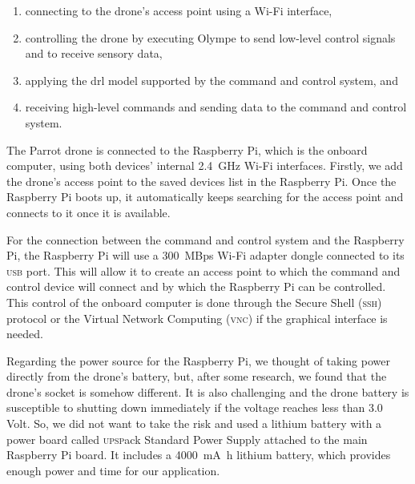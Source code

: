 \documentclass[../main.tex]{subfiles}
\begin{document}
\begin{enumerate}
    \item connecting to the drone's access point 
        using a Wi-Fi interface,
    \item controlling the drone 
        by executing Olympe to send low-level control signals 
        and to receive sensory data,
    \item applying the \gls{drl} model supported by 
        the command and control system, and
    \item receiving high-level commands and 
        sending data to the command and control system.
\end{enumerate}
 
The Parrot \anafi drone is connected 
to the Raspberry Pi, which is the onboard computer,
using both devices' internal 
\SI{2.4}{\giga\hertz}
Wi-Fi interfaces. 
Firstly, we add the \anafi drone's access point 
to the saved devices list in the Raspberry Pi.
Once the Raspberry Pi boots up, it automatically keeps 
searching for the access point and connects 
to it once it is available.

For the connection between the command and control system 
and the Raspberry Pi, 
the Raspberry Pi will use a 
\SI[per-mode=symbol,per-symbol=p]{300}{MBps} 
Wi-Fi adapter dongle connected to 
its \textsc{usb} port. 
This will allow it to create an access point
to which the command and control device 
will connect and by which the Raspberry Pi can be controlled.
This control of the onboard computer 
is done through the Secure Shell (\textsc{ssh})
protocol or the Virtual Network Computing (\textsc{vnc})
if the graphical interface is needed. 

Regarding the power source for the Raspberry Pi, 
we thought of taking power directly from the 
drone's battery, but, after some research, we found 
that the \anafi drone's  
socket is somehow different. It is also challenging 
and the drone battery is susceptible to shutting down 
immediately if the voltage reaches less than 3.0 Volt. 
So, we did not want to take the risk and used a 
lithium battery with a power board called 
\textsc{upsp}ack Standard Power Supply attached to 
the main Raspberry Pi board. It includes a 
\SI{4000}{\milli\ampere\hour}
lithium battery, which provides enough power 
and time for our application.
\end{document}
